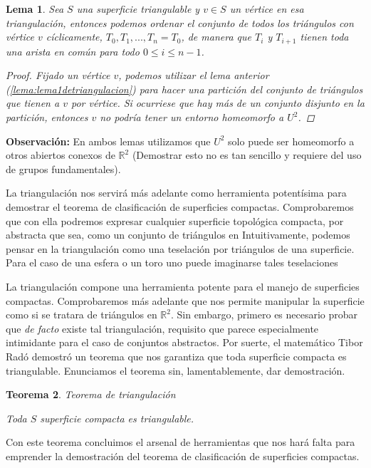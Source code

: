 \documentclass[a4paper,11pt,spanish, twoside, leqno]{tfg-uam}
\newcommand*{\reales}{\mathbb{R}}
\newtheorem{teor}{Teorema}[chapter]
\newtheorem{lema}[teor]{Lema}
\theoremstyle{definition}
\begin{document}
\begin{lema}\label{lema:lema2detriangulacion}
	Sea  $S$ una superficie triangulable y $v\in S$ un vértice en esa triangulación, entonces podemos ordenar el conjunto de todos los triángulos con vértice $v$ cíclicamente,  $T_0, T_1, ..., T_n = T_0$, de manera que $T_i$ y $T_{i+1}$ tienen toda una arista en común para todo $0\leq i\leq n-1$.
	\begin{proof}
	    Fijado un vértice $v$, podemos utilizar el lema anterior (\ref{lema:lema1detriangulacion}) para hacer una partición del conjunto de triángulos que tienen a $v$ por vértice. Si ocurriese que hay más de un conjunto disjunto en la partición, entonces $v$ no podría tener un entorno homeomorfo a $U^2$.
	\end{proof}
\end{lema}
\textbf{Observación:} En ambos lemas utilizamos que $U^2$ solo puede ser homeomorfo a otros abiertos conexos de $\reales^2$ (Demostrar esto no es tan sencillo y requiere del uso de grupos fundamentales).


La triangulación nos servirá más adelante como herramienta potentísima para demostrar el teorema de clasificación de superficies compactas. Comprobaremos que con ella podremos expresar cualquier superficie topológica compacta, por abstracta que sea, como un conjunto de triángulos en 
Intuitivamente, podemos pensar en la triangulación como una teselación por triángulos de una superficie. Para el caso de una esfera o un toro uno puede imaginarse tales teselaciones

La triangulación compone una herramienta potente para el manejo de superficies compactas. Comprobaremos más adelante que nos permite manipular la superficie como si se tratara de triángulos en $\mathbb{R}^2$. Sin embargo, primero es necesario probar que \textit{de facto} existe tal triangulación, requisito que parece especialmente intimidante para el caso de conjuntos abstractos. Por suerte, el matemático Tibor Radó demostró un teorema que nos garantiza que toda superficie compacta es triangulable. Enunciamos el teorema sin, lamentablemente, dar demostración.

\begin{teor}{Teorema de triangulación}\label{teor:teoremaDeTriangulacion}	
	
	Toda $S$ superficie compacta es triangulable.
\end{teor}

Con este teorema concluimos el arsenal de herramientas que nos hará falta para emprender la demostración del teorema de clasificación de superficies compactas.
\end{document}
